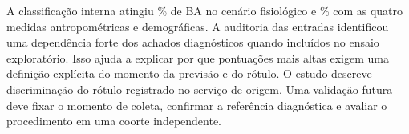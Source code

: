 A classificação interna atingiu \FisioBestBA\% de BA no cenário fisiológico e \StrictBestBA\% com as quatro medidas antropométricas e demográficas. A auditoria das entradas identificou uma dependência forte dos achados diagnósticos quando incluídos no ensaio exploratório. Isso ajuda a explicar por que pontuações mais altas exigem uma definição explícita do momento da previsão e do rótulo. O estudo descreve discriminação do rótulo registrado no serviço de origem. Uma validação futura deve fixar o momento de coleta, confirmar a referência diagnóstica e avaliar o procedimento em uma coorte independente.
